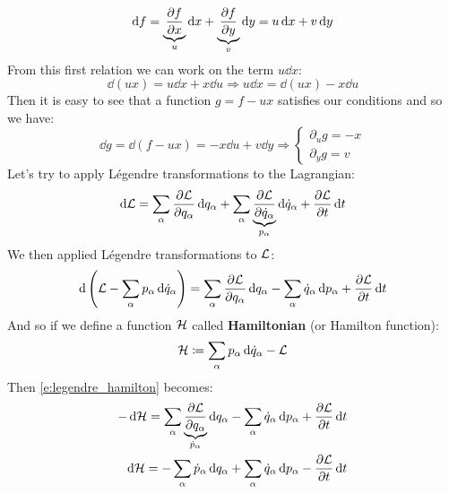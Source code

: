 \begin{equation}
    \dd{f} = \underbrace{\pdv{f}{x}}_u \dd{x} + \underbrace{\pdv{f}{y}}_v \dd{y} = u\dd{x} + v\dd{y}
\end{equation}
From this first relation we can work on the term $u\dd{x}$:
\begin{equation}
    \dd{(ux)} = u\dd{x} + x\dd{u} \Rightarrow u\dd{x} = \dd{(ux)} - x\dd{u}
\end{equation}
Then it is easy to see that a function $g = f-ux$ satisfies our conditions and so we have:
\begin{equation}
    \dd{g} = \dd{(f-ux)} = - x\dd{u} + v\dd{y} \Rightarrow \begin{cases}
        \partial_{u} g = -x\\
        \partial_{y} g = v
    \end{cases}
\end{equation}
Let's try to apply Légendre transformations to the Lagrangian:
\begin{equation}
    \dd{\lagr} = \bigsum_{\alpha} \pdv{\lagr}{q_{\alpha}}\dd{q_{\alpha}} + \bigsum_{\alpha} \underbrace{\pdv{\lagr}{\dot{q}_{\alpha}}}_{p_{\alpha}}\dd{\dot{q}_{\alpha}} + \pdv{\lagr}{t}\dd{t}
\end{equation}
We then applied Légendre transformations to $\mathcal{L}$:
\begin{equation} \label{e:legendre_hamilton}
    \dd{\brackets{\lagr - \bigsum_{\alpha} p_{\alpha}\dd{\dot{q}_{\alpha}}}} = \bigsum_{\alpha} \pdv{\lagr}{q_{\alpha}}\dd{q_{\alpha}} - \bigsum_{\alpha} \dot{q}_{\alpha}\dd{p_{\alpha}} + \pdv{\lagr}{t}\dd{t}
\end{equation}
And so if we define a function $\mathcal{H}$ called \textbf{Hamiltonian} (or Hamilton function):
\begin{equation}
    \mathcal{H} \coloneqq \displaystyle\sum_{\alpha} p_{\alpha}\dd{\dot{q}_{\alpha}} -\mathcal{L}
\end{equation}
Then \eqref{e:legendre_hamilton} becomes:
\begin{equation}
    \begin{split}
        -\dd{\hamfun} = \bigsum_{\alpha} \underbrace{\pdv{\lagr}{q_{\alpha}}}_{\dot{p}_{\alpha}}\dd{q_{\alpha}} - \bigsum_{\alpha} \dot{q}_{\alpha}\dd{p_{\alpha}} + \pdv{\lagr}{t}\dd{t}\\
        \dd{\hamfun} = -\bigsum_{\alpha} \dot{p}_{\alpha}\dd{q_{\alpha}} + \bigsum_{\alpha} \dot{q}_{\alpha}\dd{p_{\alpha}} - \pdv{\lagr}{t}\dd{t}\\
    \end{split}
\end{equation}
